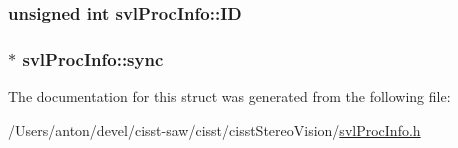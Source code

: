 \subsubsection[{I\+D}]{\setlength{\rightskip}{0pt plus 5cm}unsigned int svl\+Proc\+Info\+::\+I\+D}\label{structsvl_proc_info_afc6f44188d8eb0d790d5355880323830}
\hypertarget{structsvl_proc_info_a43238972bbbf3b4d82e9a28e1c8fd410}{}
\subsubsection[{sync}]{$\ast$ svl\+Proc\+Info\+::sync}\label{structsvl_proc_info_a43238972bbbf3b4d82e9a28e1c8fd410}


The documentation for this struct was generated from the following file\+:\begin{DoxyCompactItemize}
\item 
/\+Users/anton/devel/cisst-\/saw/cisst/cisst\+Stereo\+Vision/\hyperlink{svl_proc_info_8h}{svl\+Proc\+Info.\+h}\end{DoxyCompactItemize}
